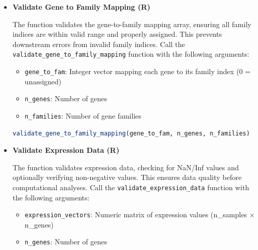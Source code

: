 \begin{enumerate}
\begin{itemize}
            \item \textbf{Validate Gene to Family Mapping (R)}
                  
                  The function validates the gene-to-family mapping array, ensuring all
                  family indices are within valid range and properly assigned. This prevents
                  downstream errors from invalid family indices. Call the \texttt{validate\_gene\_to\_family\_mapping}
                  function with the following arguments:
                  
                  \begin{itemize}
                    \item \texttt{gene\_to\_fam}: Integer vector mapping each gene to its family
                          index (0 = unassigned)
                          
                    \item \texttt{n\_genes}: Number of genes
                          
                    \item \texttt{n\_families}: Number of gene families
                  \end{itemize}
                  
                  \begin{lstlisting}[language=R, caption={R Validate Gene to Family Mapping}]
validate_gene_to_family_mapping(gene_to_fam, n_genes, n_families)
                  \end{lstlisting}
                  
            \item \textbf{Validate Expression Data (R)}
                  
                  The function validates expression data, checking for NaN/Inf values and
                  optionally verifying non-negative values. This ensures data quality before
                  computational analyses. Call the \texttt{validate\_expression\_data} function
                  with the following arguments:
                  
                  \begin{itemize}
                    \item \texttt{expression\_vectors}: Numeric matrix of expression values (n\_samples
                          × n\_genes)
                          
                    \item \texttt{n\_genes}: Number of genes
                          

\end{itemize}
\end{itemize}
\end{enumerate}
